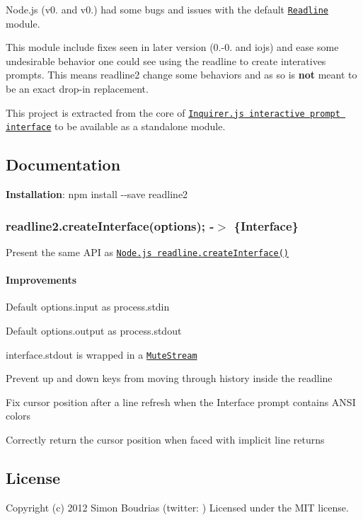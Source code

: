 Node.\+js (v0. and v0.) had some bugs and issues with the default \href{http://nodejs.org/api/readline.html}{\tt Readline} module.

This module include fixes seen in later version (0.-\/0. and iojs) and ease some undesirable behavior one could see using the readline to create interatives prompts. This means {\ttfamily readline2} change some behaviors and as so is {\bfseries not} meant to be an exact drop-\/in replacement.

This project is extracted from the core of \href{https://github.com/SBoudrias/Inquirer.js}{\tt Inquirer.\+js interactive prompt interface} to be available as a standalone module.

\subsection*{Documentation }

{\bfseries Installation}\+: {\ttfamily npm install -\/-\/save readline2}

\subsubsection*{readline2.\+create\+Interface(options); -\/$>$ \{Interface\}}

Present the same A\+PI as \href{http://nodejs.org/api/readline.html}{\tt Node.\+js {\ttfamily readline.\+create\+Interface()}}

\paragraph*{Improvements}


\begin{DoxyItemize}
\item Default {\ttfamily options.\+input} as {\ttfamily process.\+stdin}
\item Default {\ttfamily options.\+output} as {\ttfamily process.\+stdout}
\item {\ttfamily interface.\+stdout} is wrapped in a \href{https://github.com/isaacs/mute-stream}{\tt Mute\+Stream}
\item Prevent {\ttfamily up} and {\ttfamily down} keys from moving through history inside the readline
\item Fix cursor position after a line refresh when the {\ttfamily Interface} prompt contains A\+N\+SI colors
\item Correctly return the cursor position when faced with implicit line returns
\end{DoxyItemize}

\subsection*{License }

Copyright (c) 2012 Simon Boudrias (twitter\+: \href{https://twitter.com/Vaxilart}{\tt }) Licensed under the M\+IT license. 